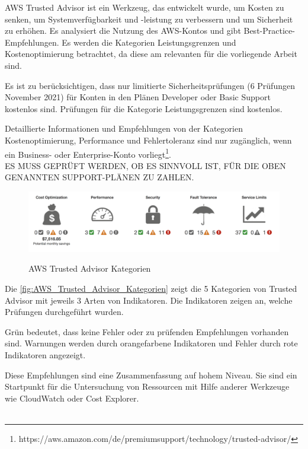 AWS Trusted Advisor ist ein Werkzeug, das entwickelt wurde, um Kosten zu senken, um Systemverfügbarkeit und -leistung zu verbessern und um Sicherheit zu erhöhen. Es analysiert die Nutzung des AWS-Kontos und gibt Best-Practice-Empfehlungen.
Es werden die Kategorien Leistungsgrenzen und Kostenoptimierung betrachtet, da diese am relevanten für die vorliegende Arbeit sind.

Es ist zu berücksichtigen, dass nur limitierte Sicherheitsprüfungen (6 Prüfungen November 2021) für Konten in den Plänen Developer oder Basic Support kostenlos sind. Prüfungen für die Kategorie Leistungsgrenzen sind kostenlos.

Detaillierte Informationen und Empfehlungen von der Kategorien Kostenoptimierung, Performance und Fehlertoleranz sind nur zugänglich, wenn ein Business- oder Enterprise-Konto vorliegt\footnote{https://aws.amazon.com/de/premiumsupport/technology/trusted-advisor/}. \\
ES MUSS GEPRÜFT WERDEN, OB ES SINNVOLL IST, FÜR DIE OBEN GENANNTEN SUPPORT-PLÄNEN ZU ZAHLEN.

  \begin{figure}
      \centering
      \includegraphics[scale=0.4]{sources/AWS_Trusted_Advisor_Kategorien}
      \caption[AWS Trusted Advisor Kategorien]{}
      \label{fig:AWS_Trusted_Advisor_Kategorien} AWS Trusted Advisor Kategorien
    \end{figure}

  Die \autoref{fig:AWS_Trusted_Advisor_Kategorien} zeigt die 5 Kategorien von Trusted Advisor mit jeweils 3 Arten von Indikatoren. 
  Die Indikatoren zeigen an, welche Prüfungen durchgeführt wurden.
  
  Grün bedeutet, dass keine Fehler oder zu prüfenden Empfehlungen vorhanden sind. Warnungen werden durch orangefarbene Indikatoren und Fehler durch rote Indikatoren angezeigt.
  
  Diese Empfehlungen sind eine Zusammenfassung auf hohem Niveau. Sie sind ein Startpunkt für die Untersuchung von Ressourcen mit Hilfe anderer Werkzeuge wie CloudWatch oder Cost Explorer.
\\\\

